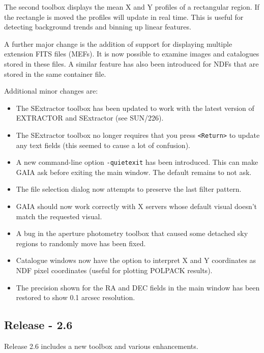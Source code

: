 \documentclass[twoside,11pt]{article}
\newcommand{\xref}[3]{#1}
\renewcommand{\_}{\texttt{\symbol{95}}}
\newcommand{\mytt}[1]{{\texttt{#1}}}
\begin{document}
  The second toolbox displays the mean X and Y profiles of a
  rectangular region. If the rectangle is moved the profiles will
  update in real time. This is useful for detecting background trends
  and binning up linear features.

  A further major change is the addition of support for displaying
  multiple extension FITS files (MEFs). It is now possible to examine
  images and catalogues stored in these files. A similar feature has
  also been introduced for NDFs that are stored in the same container
  file.

  Additional minor changes are:
  \begin{itemize}

    \item The SExtractor toolbox has been updated to work with the
    latest version of EXTRACTOR and SExtractor (see
    \xref{SUN/226}{sun226}{}).

    \item The SExtractor toolbox no longer requires that you press
    \mytt{<Return>} to update any text fields (this seemed to cause a
    lot of confusion).

    \item A new command-line option \mytt{-quiet\_exit} has been
    introduced. This can make GAIA ask before exiting the main
    window. The default remains to not ask.

    \item The file selection dialog now attempts to preserve the last
    filter pattern.

    \item GAIA should now work correctly with X servers whose default
    visual doesn't match the requested visual.

    \item A bug in the aperture photometry toolbox that caused some
    detached sky regions to randomly move has been fixed.

    \item Catalogue windows now have the option to interpret X and Y
    coordinates as \xref{NDF}{sun33}{} \xref{pixel
    coordinates}{sun95}{se_pixgrd} (useful for plotting
    \xref{POLPACK}{sun223}{} results).

    \item The precision shown for the RA and DEC fields in the main
    window has been restored to show 0.1 arcsec resolution.
  \end{itemize}

\subsection{Release - 2.6} 
  Release 2.6 includes a new toolbox and various enhancements.
\end{document}
